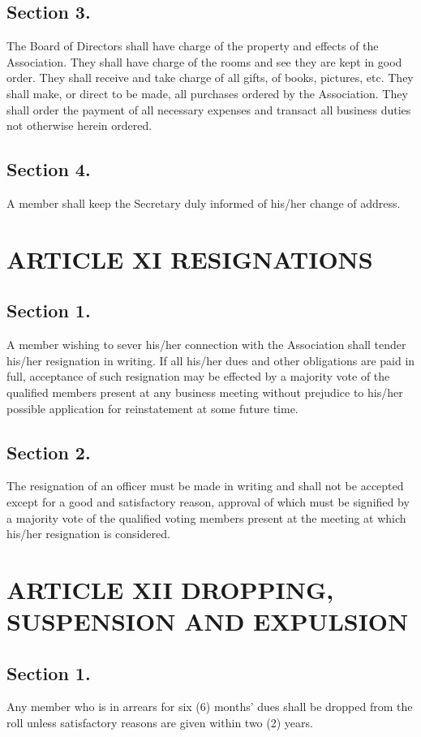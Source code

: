 \documentclass[12pt,letterpaper]{article}
\begin{document}
\subsection*{Section 3.} The Board of Directors shall have charge of the property and effects of the
Association. They shall have charge of the rooms and see they are kept in good order.
They shall receive and take charge of all gifts, of books, pictures, etc. They shall make,
or direct to be made, all purchases ordered by the Association. They shall order the
payment of all necessary expenses and transact all business duties not otherwise herein
ordered.
\subsection*{Section 4.} A member shall keep the Secretary duly informed of his/her change of
address.

\section*{ARTICLE XI
RESIGNATIONS}

\subsection*{Section 1.} A member wishing to sever his/her connection with the Association shall
tender his/her resignation in writing. If all his/her dues and other obligations are paid in
full, acceptance of such resignation may be effected by a majority vote of the qualified
members present at any business meeting without prejudice to his/her possible
application for reinstatement at some future time.
\subsection*{Section 2.} The resignation of an officer must be made in writing and shall not be
accepted except for a good and satisfactory reason, approval of which must be signified
by a majority vote of the qualified voting members present at the meeting at which
his/her resignation is considered.

\section*{ARTICLE XII
DROPPING, SUSPENSION AND EXPULSION}

\subsection*{Section 1.} Any member who is in arrears for six (6) months’ dues shall be dropped
from the roll unless satisfactory reasons are given within two (2) years.
\end{document}
